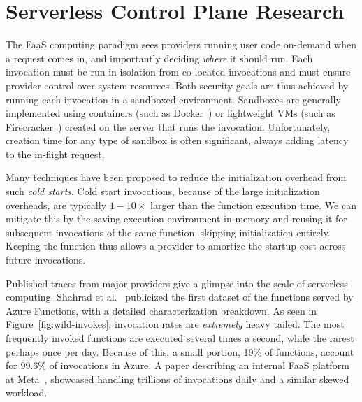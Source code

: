 \section{Serverless Control Plane Research}
\label{sec:platform-enhance}

The FaaS computing paradigm sees providers running user code on-demand when a request comes in, and importantly deciding \emph{where} it should run. 
Each invocation must be run in isolation from co-located invocations and must ensure provider control over system resources.
Both security goals are thus achieved by running each invocation in a sandboxed environment. 
Sandboxes are generally implemented using containers (such as Docker~\cite{docker-main}) or lightweight VMs (such as Firecracker~\cite{firecracker-nsdi20}) created on the server that runs the invocation.
Unfortunately, creation time for any type of sandbox is often significant, always adding latency to the in-flight request. 

Many techniques have been proposed to reduce the initialization overhead from such \emph{cold starts}.
Cold start invocations, because of the large initialization overheads, are typically $1-10\times$ larger than the function execution time.
We can mitigate this by the saving execution environment in memory and reusing it for subsequent invocations of the same function, skipping initialization entirely. 
Keeping the function  thus allows a provider to amortize the startup cost across future invocations.

Published traces from major providers give a glimpse into the scale of serverless computing.
Shahrad et al.~\cite{shahrad_serverless_2020} publicized the first dataset of the functions served by Azure Functions, with a detailed characterization breakdown.
As seen in Figure~\ref{fig:wild-invokes}, invocation rates are \emph{extremely} heavy tailed.
The most frequently invoked functions are executed several times a second, while the rarest perhaps once per day.
Because of this, a small portion, 19\% of functions, account for 99.6\% of invocations in Azure.
A paper describing an internal FaaS platform at Meta~\cite{sahraei2023xfaas}, showcased handling trillions of invocations daily and a similar skewed workload.

